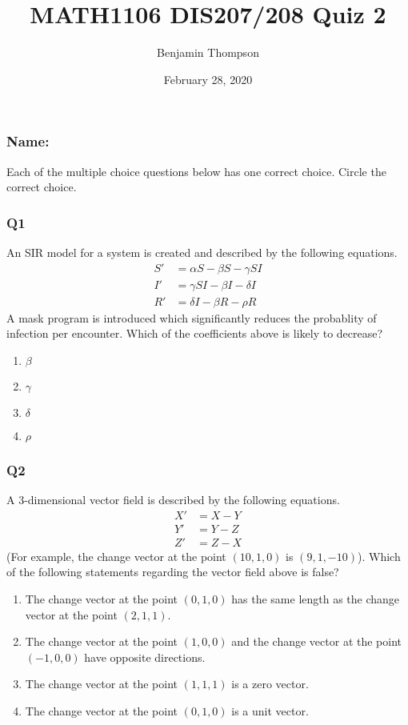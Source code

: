 \documentclass[a4paper,12pt]{article}
\title{MATH1106 DIS207/208 Quiz 2}
\author{Benjamin Thompson}
\date{February 28, 2020}
\begin{document}
\subsubsection*{Name:}
Each of the multiple choice questions below has one correct choice. Circle the correct choice.
\subsubsection*{Q1}
An SIR model for a system is created and described by the following equations.
\begin{align*}
S' &= \alpha S - \beta S - \gamma SI \\
I' &= \gamma SI - \beta I - \delta I \\
R' &= \delta I - \beta R - \rho R
\end{align*}
A mask program is introduced which significantly reduces the probablity of infection per encounter. Which of the coefficients above is likely to decrease?

\begin{enumerate}[label=(\alph*)]
\item $\beta$
\item $\gamma$
\item $\delta$
\item $\rho$
\end{enumerate}

\subsubsection*{Q2}
A $3$-dimensional vector field is described by the following equations.
\begin{align*}
	X' &= X - Y \\
	Y' &= Y - Z \\
	Z' &= Z - X
\end{align*}
(For example, the change vector at the point $(10,1,0)$ is $(9,1,-10)$). Which of the following statements regarding the vector field above is false?
\begin{enumerate}[label=(\alph*)]
\item The change vector at the point $(0,1,0)$ has the same length as the change vector at the point $(2,1,1)$.
\item The change vector at the point $(1,0,0)$ and the change vector at the point $(-1,0,0)$ have opposite directions.
\item The change vector at the point $(1,1,1)$ is a zero vector.
\item The change vector at the point $(0,1,0)$ is a unit vector.
\end{enumerate}
\end{document}
